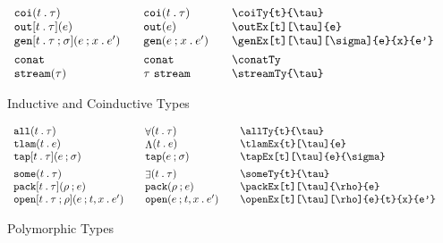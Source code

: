 \documentclass[11pt]{article}
\begin{document}
\begin{figure}
\begin{small}
\begin{displaymath}
\begin{array}{l@{\qquad}l@{\qquad}l@{\qquad}l}
        \coiTy{t}{\tau}                      & \coiTy*{t}{\tau}                    & \verb|\coiTy{t}{\tau}|                         \\
        \outEx[t][\tau]{e}                   & \outEx*{e}                          & \verb|\outEx[t][\tau]{e}|                      \\
        \genEx[t][\tau][\sigma]{e}{x}{e'}    & \genEx*{e}{x}{e'}                   & \verb|\genEx[t][\tau][\sigma]{e}{x}{e'}|       \\[1ex]

        \conatTy                             & \conatTy*                           & \verb|\conatTy|                                \\
        \streamTy{\tau}                      & \streamTy*{\tau}                    & \verb|\streamTy{\tau}|
      \end{array}
    \end{displaymath}
  \end{small}

  \caption{Inductive and Coinductive Types}
  \label{fig:icoi}
\end{figure}

\begin{figure}

  \begin{small}
    \begin{displaymath}
      \begin{array}{l@{\qquad}l@{\qquad}l@{\qquad}l}
        \allTy{t}{\tau}                     & \allTy*{t}{\tau}                     & \verb|\allTy{t}{\tau}|                     \\
        \tlamEx{t}[\tau]{e}                 & \tlamEx*{t}{e}                       & \verb|\tlamEx{t}[\tau]{e}|                 \\
        \tapEx[t][\tau]{e}{\sigma}          & \tapEx*{e}{\sigma}                   & \verb|\tapEx[t][\tau]{e}{\sigma}|          \\[1ex]
        \someTy{t}{\tau}                    & \someTy*{t}{\tau}                    & \verb|\someTy{t}{\tau}|                    \\
        \packEx[t][\tau]{\rho}{e}           & \packEx*{\rho}{e}                    & \verb|\packEx[t][\tau]{\rho}{e}|           \\
        \openEx[t][\tau][\rho]{e}{t}{x}{e'} & \openEx*[t][\tau][\rho]{e}{t}{x}{e'} & \verb|\openEx[t][\tau][\rho]{e}{t}{x}{e'}|
      \end{array}
    \end{displaymath}
  \end{small}

  \caption{Polymorphic Types}
  \label{fig:poly}
\end{figure}
\end{document}
